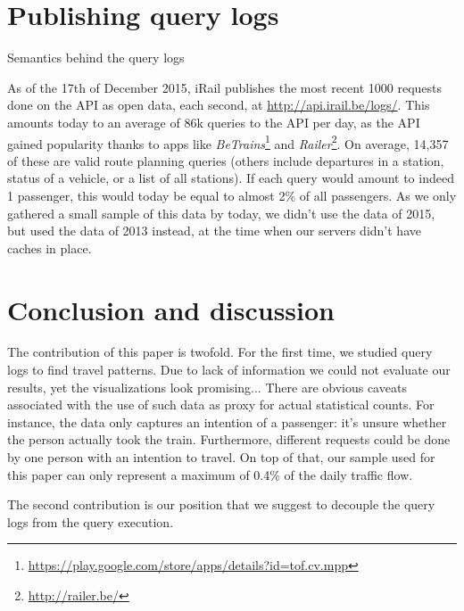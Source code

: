\documentclass{sig-alternate}
\begin{document}
\section{Publishing query logs}
\label{sec:publishingquerylogs}

Semantics behind the query logs

As of the 17th of December 2015, iRail publishes the most recent 1000 requests done on the API as open data, each second, at \url{http://api.irail.be/logs/}.
This amounts today to an average of 86k queries to the API per day, as the API gained popularity thanks to apps like \emph{BeTrains}\footnote{\url{https://play.google.com/store/apps/details?id=tof.cv.mpp}} and \emph{Railer}\footnote{\url{http://railer.be/}}.
On average, 14,357 of these are valid route planning queries (others include departures in a station, status of a vehicle, or a list of all stations).
If each query would amount to indeed 1 passenger, this would today be equal to almost 2\% of all passengers.
As we only gathered a small sample of this data by today, we didn't use the data of 2015, but used the data of 2013 instead, at the time when our servers didn't have caches in place.

\section{Conclusion and discussion}
\label{sec:conclusion}

The contribution of this paper is twofold.
For the first time, we studied query logs to find travel patterns.
Due to lack of information we could not evaluate our results, yet the visualizations look promising...
There are obvious caveats associated with the use of such data as proxy for actual statistical counts. 
For instance, the data only captures an intention of a passenger: it's unsure whether the person actually took the train.
Furthermore, different requests could be done by one person with an intention to travel.
On top of that, our sample used for this paper can only represent a maximum of 0.4\% of the daily traffic flow.

The second contribution is our position that we suggest to decouple the query logs from the query execution.

\let\oldsection\section
\renewcommand{\section}[2][1]{\oldsection{#1}\vspace{-3pt}}



\end{document}
